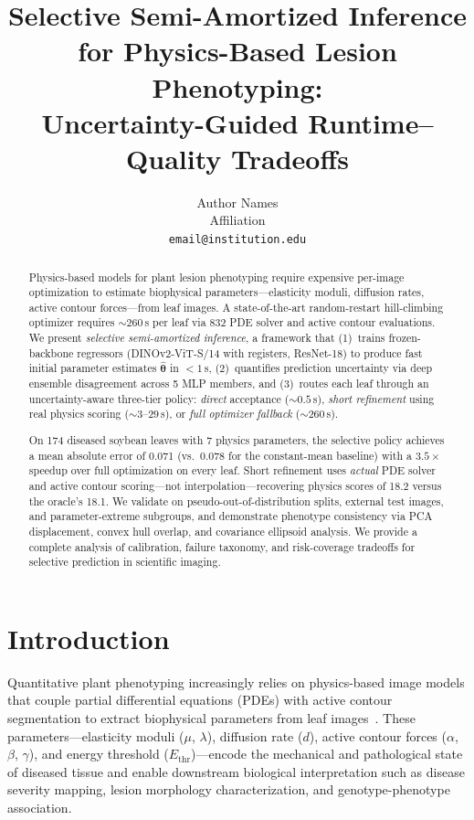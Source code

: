 \documentclass[11pt,a4paper]{article}
\title{Selective Semi-Amortized Inference for Physics-Based Lesion Phenotyping:\\
Uncertainty-Guided Runtime--Quality Tradeoffs}
\author{
  Author Names\\
  Affiliation\\
  \texttt{email@institution.edu}
}
\date{}
\newcommand{\btheta}{\boldsymbol{\theta}}
\begin{document}
\maketitle

\begin{abstract}
Physics-based models for plant lesion phenotyping require expensive per-image optimization
to estimate biophysical parameters---elasticity moduli, diffusion rates, active contour
forces---from leaf images. A state-of-the-art random-restart hill-climbing optimizer
requires ${\sim}260$\,s per leaf via 832 PDE solver and active contour evaluations.
We present \emph{selective semi-amortized inference}, a framework that
(1)~trains frozen-backbone regressors (DINOv2-ViT-S/14 with registers, ResNet-18) to produce
fast initial parameter estimates $\hat{\btheta}$ in $<1$\,s,
(2)~quantifies prediction uncertainty via deep ensemble disagreement across 5 MLP members, and
(3)~routes each leaf through an uncertainty-aware three-tier policy:
\emph{direct} acceptance (${\sim}0.5$\,s),
\emph{short refinement} using real physics scoring (${\sim}3$--$29$\,s), or
\emph{full optimizer fallback} (${\sim}260$\,s).

On 174 diseased soybean leaves with 7 physics parameters,
the selective policy achieves a mean absolute error of 0.071
(vs.\ 0.078 for the constant-mean baseline) with a $3.5\times$ speedup over
full optimization on every leaf. Short refinement uses \emph{actual} PDE solver
and active contour scoring---not interpolation---recovering physics scores
of 18.2 versus the oracle's 18.1.
We validate on pseudo-out-of-distribution splits, external test images,
and parameter-extreme subgroups, and demonstrate phenotype consistency
via PCA displacement, convex hull overlap, and covariance ellipsoid analysis.
We provide a complete analysis of calibration, failure taxonomy,
and risk-coverage tradeoffs for selective prediction in scientific imaging.
\end{abstract}

\section{Introduction}
\label{sec:intro}

Quantitative plant phenotyping increasingly relies on physics-based image models
that couple partial differential equations (PDEs) with active contour segmentation
to extract biophysical parameters from leaf images~\cite{singh2021plantdoc,mahlein2016plant}.
These parameters---elasticity moduli ($\mu$, $\lambda$), diffusion rate ($d$),
active contour forces ($\alpha$, $\beta$, $\gamma$), and energy threshold ($E_\text{thr}$)---encode
the mechanical and pathological state of diseased tissue and enable
downstream biological interpretation such as disease severity mapping,
lesion morphology characterization, and genotype-phenotype association.
\end{document}
